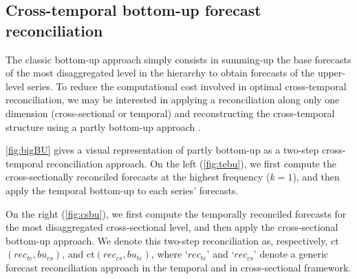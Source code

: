 \documentclass[a4paper,11pt]{article}
\theoremstyle{definition}
\begin{document}
\subsection{Cross-temporal bottom-up forecast reconciliation}\label{ssec:ctbu}

The classic bottom-up approach \citep{dunn1976, dangerfield1992} simply consists in summing-up the base forecasts of the most disaggregated level in the hierarchy to obtain forecasts of the upper-level series. To reduce the computational cost involved in optimal cross-temporal reconciliation, we may be interested in applying a reconciliation along only one dimension (cross-sectional or temporal) and reconstructing the cross-temporal structure using a partly bottom-up approach \citep{difonzo2022b, difonzo2023a, sanguri2022}.

\autoref{fig:bigBU} gives a visual representation of partly bottom-up as a two-step cross-temporal reconciliation approach. On the left (\autoref{fig:tebu}), we first compute the cross-sectionally reconciled forecasts at the highest frequency ($k = 1$), and then apply the temporal bottom-up to each series' forecasts.

On the right (\autoref{fig:csbu}), we first compute the temporally reconciled forecasts for the most disaggregated cross-sectional level, and then apply the cross-sectional bottom-up approach. We denote this two-step reconciliation as, respectively, ct$(rec_{te},bu_{cs})$, and ct$(rec_{cs},bu_{te})$, where ‘$rec_{te}$’ and ‘$rec_{cs}$’ denote a generic forecast reconciliation approach in the temporal and in cross-sectional framework.
\end{document}
